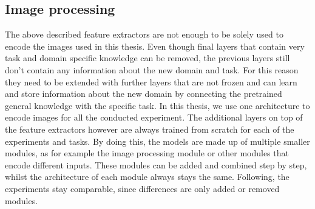 
\subsection{Image processing}

The above described feature extractors are not enough to be solely used to encode the images used in this thesis.
Even though final layers that contain very task and domain specific knowledge can be removed, the previous layers still don't contain any information about the new domain and task.
For this reason they need to be extended with further layers that are not frozen and can learn and store information about the new domain by connecting the pretrained general knowledge with the specific task.
In this thesis, we use one architecture to encode images for all the conducted experiment.
The additional layers on top of the feature extractors however are always trained from scratch for each of the experiments and tasks.
By doing this, the models are made up of multiple smaller modules, as for example the image processing module or other modules that encode different inputs.
These modules can be added and combined step by step, whilst the architecture of each module always stays the same.
Following, the experiments stay comparable, since differences are only added or removed modules.

